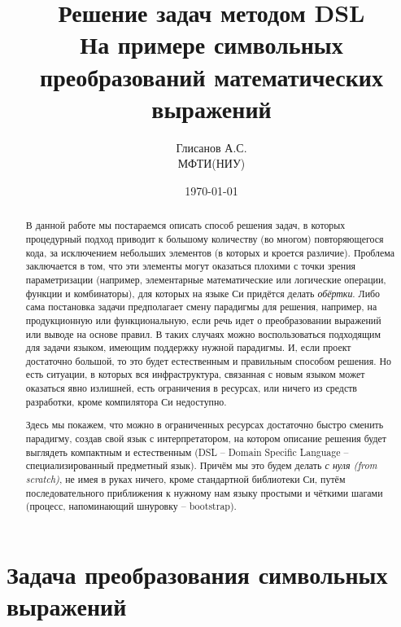 \documentclass[10pt]{report}
\title{Решение задач методом DSL\\
	На примере символьных преобразований математических выражений}
\author{Глисанов А.С.\\МФТИ(НИУ)}
\date{\today}
\begin{document}
\maketitle
\begin{abstract}
В данной работе мы постараемся описать способ решения задач, в которых процедурный подход приводит к большому количеству (во многом) повторяющегося кода,
	за исключением небольших элементов (в которых и кроется различие).
	Проблема заключается в том, что эти элементы могут оказаться плохими с точки зрения параметризации (например, элементарные математические или логические операции, функции и комбинаторы), для которых на языке Си придётся делать {\em обёртки}.
Либо сама постановка задачи предполагает смену парадигмы для решения, например, на продукционную или функциональную, если речь идет о преобразовании выражений или выводе на основе правил.
В таких случаях можно воспользоваться подходящим для задачи языком, имеющим поддержку нужной парадигмы.
И, если проект достаточно большой, то это будет естественным и правильным способом решения.
Но есть ситуации, в которых вся инфраструктура, связанная с новым языком может оказаться явно излишней, есть ограничения в ресурсах, или ничего из средств разработки, кроме компилятора Си недоступно.

Здесь мы покажем, что можно в ограниченных ресурсах достаточно быстро сменить парадигму, создав свой язык с интерпретатором, на котором описание решения будет выглядеть компактным и естественным (DSL -- Domain Specific Language -- специализированный предметный язык).
Причём мы это будем делать {\em с нуля (from scratch)}, не имея в руках ничего, кроме стандартной библиотеки Си, путём последовательного приближения к нужному нам языку простыми и чёткими шагами (процесс,  напоминающий шнуровку -- bootstrap).
\end{abstract} 
\dominitoc
\tableofcontents
\thispagestyle{empty}

\chapter{Задача преобразования символьных выражений}
\minitoc
\end{document}
